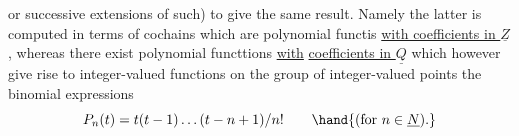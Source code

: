 
or successive extensions of such) to give the same result.  Namely 
the latter is computed in terms of cochains which are polynomial functis
\uline{with coefficients in $\underline{Z}$} ,  whereas there exist polynomial functtions \uline{with}
\uline{coefficients in $\underline{Q}$}  which\hand{,} however\hand{,} give rise to integer-valued functions on
the group of integer-valued points   the binomial expressions
\[ P_n(t) = t(t-1)\dots(t-n+1)/n! \qquad \hand{\text{(for }n \in \underline{N}).} \]

